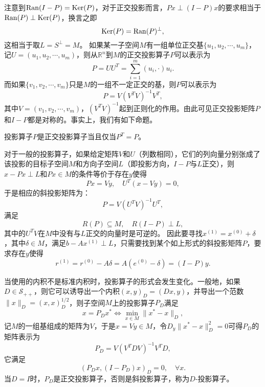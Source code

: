 \documentclass[a4paper,10pt]{ctexart}
\begin{document}
注意到$ {\rm Ran}(I-P) = {\rm Ker}(P) $，对于正交投影而言，$ Px \perp (I-P)x $的要求相当于$ {\rm Ran}(P) \perp {\rm Ker}(P) $，换言之即
\[
    {\rm Ker}(P) = {\rm Ran}(P)^\perp,
\]
这相当于取$ L = S^\perp = M $。
如果某一子空间$ M $有一组单位正交基$ \{u_1,u_2,\cdots ,u_m\} $，记$ U = (u_1,u_2,\cdots ,u_m) $，则从$ \mathbb{R}^n $到$ M $的正交投影算子$ P $可以表示为
\begin{equation}
    P = UU^T = \sum_{i=1}^m (u_i, \cdot) u_i.
\end{equation}
而如果$ \{v_1, v_2,\cdots ,v_m\} $只是$ M $的一组不一定正交的基，则$ P $可以表示为
\begin{equation}
    P = V(V^TV)^{-1}V^T,
\end{equation}
其中$ V = (v_1,v_2,\cdots ,v_m) $，$ (V^TV)^{-1} $起到正则化的作用。由此可见正交投影矩阵$ P $和$ I-P $都是对称的。事实上，我们有如下命题。
\begin{proposition}
    投影算子$ P $是正交投影算子当且仅当$ P^T = P $。
\end{proposition}

对于一般的投影算子，如果给定矩阵$ V $和$ U $（列数相同），它们的列向量分别张成了该投影的目标子空间$ M $和方向子空间$ L $（即投影方向，$ I-P $与$ L $正交），则$ x-Px\perp L $和$ Px\in M $的条件等价于存在$ y $使得
\[
    Px= Vy,\quad U^T(x-Vy) = 0,
\]
于是相应的斜投影矩阵为：
\begin{equation}
    P = V(U^TV)^{-1}U^T,
\end{equation}
满足
\[
    R(P)\subseteq M,\quad R(I-P)\perp L,
\]
其中的$ U^TV $在$ M $中没有与$ L $正交的向量时是可逆的。
因此要寻找$ x^{(1)} = x^{(0)} + \delta $，其中$ \delta\in M $，满足$ b-Ax^{(1)}\perp L $，只需要找到某个如上形式的斜投影矩阵$ P $，要求存在$ y $使得
\[
    r^{(1)} = r^{(0)} -A \delta = A(e^{(0)}-\delta) = (I-P)y.
\]

当使用的内积不是标准内积时，投影算子的形式会发生变化。一般地，如果$ D\in \mathcal{S}_{++} $，则它可以诱导出一个内积$ (x,y)_D = (Dx,y) $，并导出一个范数$ \| x \|_D = (x,x)_D^{1 / 2} $，则子空间$ M $上的投影算子$ P_D $满足
\begin{equation}
    x = P_D x^* \iff \min_{x\in M} \| x^* - x \|_D,
\end{equation}
记$ M $的一组基组成的矩阵为$ V $，于是$ x=Vy\in M $，令$ D_y\| x^* - x \|_D^2=0 $可得$ P_D $的矩阵表示为
\begin{equation}
    P_D = V(V^TDV)^{-1}V^TD,
\end{equation}
它满足
\begin{equation}
    (P_Dx, (I-P_D)x)_D = 0,\quad \forall x.
\end{equation}
当$ D = I $时，$ P_D $是正交投影算子，否则是斜投影算子，称为$ D $-投影算子。
\end{document}
